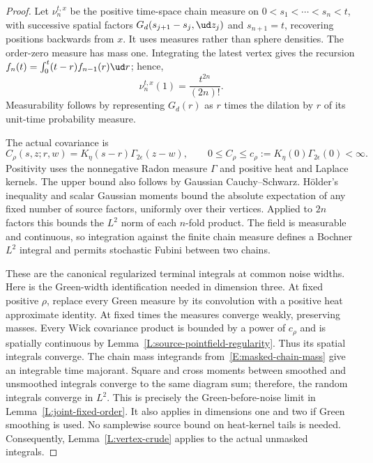 \begin{proof}
  Let $\nu_n^{t,x}$ be the positive time-space chain measure on
  $0<s_1<\cdots<s_n<t$, with successive spatial factors
  $G_d(s_{j+1}-s_j,\ud z_j)$ and $s_{n+1}=t$, recovering positions
  backwards from $x$. It uses measures rather than sphere densities.
  The order-zero measure has mass one. Integrating the latest vertex
  gives the recursion $f_n(t)=\int_0^t(t-r)f_{n-1}(r)\ud r$; hence,
  \begin{equation}\label{E:masked-chain-mass}
    \nu_n^{t,x}(1)=\frac{t^{2n}}{(2n)!}.
  \end{equation}
  Measurability follows by representing $G_d(r)$ as $r$ times the
  dilation by $r$ of its unit-time probability measure.

  The actual covariance is
  \[
    C_\rho(s,z;r,w)=K_\eta(s-r)\Gamma_{2\epsilon}(z-w),
    \qquad 0\le C_\rho\le c_\rho
    :=K_\eta(0)\Gamma_{2\epsilon}(0)<\infty.
  \]
  Positivity uses the nonnegative Radon measure $\Gamma$ and positive
  heat and Laplace kernels. The upper bound also follows by Gaussian
  Cauchy--Schwarz. H\"older's inequality and scalar Gaussian moments
  bound the absolute expectation of any fixed number of source factors,
  uniformly over their vertices. Applied to $2n$ factors this bounds
  the $L^2$ norm of each $n$-fold product. The field is measurable and
  continuous, so integration against the finite chain measure defines a
  Bochner $L^2$ integral and permits stochastic Fubini between two chains.

  These are the canonical regularized terminal integrals at common noise
  widths. Here is the Green-width identification needed in dimension
  three. At fixed positive $\rho$, replace every Green measure by its
  convolution with a positive heat approximate identity. At fixed times
  the measures converge weakly, preserving masses. Every Wick covariance
  product is bounded by a power of $c_\rho$ and is spatially continuous
  by Lemma~\ref{L:source-pointfield-regularity}. Thus its spatial integrals
  converge. The chain mass integrands from~\eqref{E:masked-chain-mass}
  give an integrable time majorant. Square and cross moments between
  smoothed and unsmoothed integrals converge to the same diagram sum;
  therefore, the random integrals converge in $L^2$. This is precisely
  the Green-before-noise limit in Lemma~\ref{L:joint-fixed-order}.
  It also applies in dimensions one and two if Green smoothing is used.
  No samplewise source bound on heat-kernel tails is needed. Consequently,
  Lemma~\ref{L:vertex-crude} applies to the actual unmasked integrals.


\end{proof}
